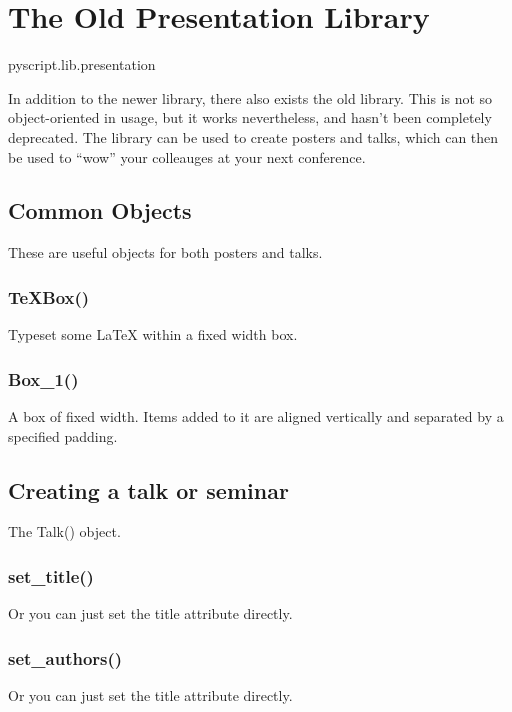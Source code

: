 \chapter{The Old Presentation Library}

\begin{python}
pyscript.lib.presentation
\end{python}

In addition to the newer  library, there also
exists the old  library.  This is not so
object-oriented in usage, but it works nevertheless, and hasn't been
completely deprecated.  The  library can be used to create
posters and talks, which can then be used to ``wow'' your colleauges at your
next conference.

\section{Common Objects}

These are useful objects for both posters and talks.

\subsection{TeXBox()}

Typeset some \LaTeX{} within a fixed width box.

\subsection{Box\_1()}

A box of fixed width.  Items added to it are aligned vertically and
separated by a specified padding.

\section{Creating a talk or seminar}

The Talk() object.

\subsection{set\_title()}

Or you can just set the title attribute directly.

\subsection{set\_authors()}
Or you can just set the title attribute directly.

